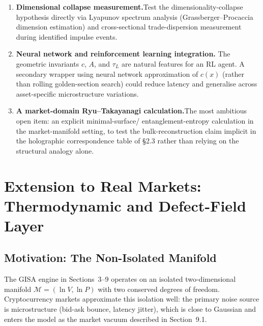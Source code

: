 \documentclass[12pt,a4paper]{article}
\begin{document}
\begin{enumerate}
    \item \textbf{Dimensional collapse measurement.}\quad Test the
          dimensionality-collapse hypothesis directly via Lyapunov
          spectrum analysis (Grassberger--Procaccia dimension estimation)
          and cross-sectional trade-dispersion measurement during
          identified impulse events.

    \item \textbf{Neural network and reinforcement learning integration.}
          \quad The geometric invariants $c$, $A$, and $\tau_L$ are
          natural features for an RL agent. A secondary wrapper using
          neural network approximation of $c(x)$ (rather than rolling
          golden-section search) could reduce latency and generalise
          across asset-specific microstructure variations.

    \item \textbf{A market-domain Ryu--Takayanagi calculation.}\quad The
          most ambitious open item: an explicit minimal-surface/
          entanglement-entropy calculation in the market-manifold setting,
          to test the bulk-reconstruction claim implicit in the holographic
          correspondence table of \S2.3 rather than relying on the
          structural analogy alone.
\end{enumerate}



\section{Extension to Real Markets: Thermodynamic and Defect-Field Layer}
\label{sec:real_markets}

\subsection{Motivation: The Non-Isolated Manifold}

The GISA engine in Sections~3--9 operates on an isolated two-dimensional
manifold $\mathcal{M} = (\ln V, \ln P)$ with two conserved degrees of
freedom. Cryptocurrency markets approximate this isolation well: the
primary noise source is microstructure (bid-ask bounce, latency jitter),
which is close to Gaussian and enters the model as the market vacuum
described in Section~9.1.
\end{document}
